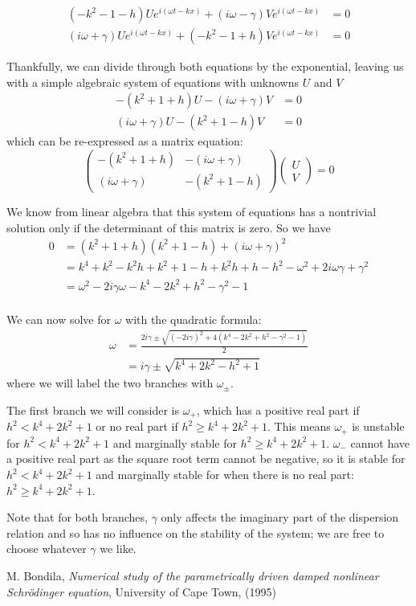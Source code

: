 \documentclass[11pt]{article}
\numberwithin{equation}{section}
\numberwithin{figure}{section}
\numberwithin{table}{section}
\begin{document}
\begin{align*}
    (-k^2-1-h)Ue^{i(\omega t-kx)}+(i\omega-\gamma)Ve^{i(\omega t-kx)}&=0\\
    (i\omega+\gamma)Ue^{i(\omega t-kx)}+(-k^2-1+h)Ve^{i(\omega t-kx)}&=0
\end{align*}
\par Thankfully, we can divide through both equations by the exponential, leaving us with a simple algebraic system of equations with unknowns $U$ and $V$
\begin{align*}
    -(k^2+1+h)U-(i\omega+\gamma)V&=0\\
    (i\omega+\gamma)U-(k^2+1-h)V&=0
\end{align*}
which can be re-expressed as a matrix equation:
\begin{equation}
    \begin{pmatrix}
        -(k^2+1+h) & -(i\omega+\gamma)\\
        (i\omega+\gamma) & -(k^2+1-h)
    \end{pmatrix}
    \begin{pmatrix}
        U\\
        V
    \end{pmatrix}
    =0
\end{equation}
\par We know from linear algebra that this system of equations has a nontrivial solution only if the determinant of this matrix is zero. So we have 
\begin{align*}
    0&=(k^2+1+h)(k^2+1-h)+(i\omega+\gamma)^2\\
    &=k^4+k^2-k^2h+k^2+1-h+k^2h+h-h^2-\omega^2+2i\omega\gamma+\gamma^2\\
    &=\omega^2-2i\gamma\omega-k^4-2k^2+h^2-\gamma^2-1\\
\end{align*}
\par We can now solve for $\omega$ with the quadratic formula:
\begin{align*}
    \omega&=\frac{2i\gamma\pm\sqrt{(-2i\gamma)^2+4(k^4-2k^2+h^2-\gamma^2-1)}}{2}\\
    &=i\gamma\pm\sqrt{k^4+2k^2-h^2+1}
\end{align*}
where we will label the two branches with $\omega_\pm$.
\par The first branch we will consider is $\omega_+$, which has a positive real part if $h^2<k^4+2k^2+1$ or no real part if $h^2\geq k^4+2k^2+1$. This means $\omega_+$ is unstable for $h^2<k^4+2k^2+1$ and marginally stable for $h^2\geq k^4+2k^2+1$. $\omega_-$ cannot have a positive real part as the square root term cannot be negative, so it is stable for $h^2<k^4+2k^2+1$ and marginally stable for when there is no real part: $h^2\geq k^4+2k^2+1$. 
\par Note that for both branches, $\gamma$ only affects the imaginary part of the dispersion relation and so has no influence on the stability of the system; we are free to choose whatever $\gamma$ we like.


\begin{thebibliography}{9}
    M. Bondila, \textit{Numerical study of the parametrically driven damped nonlinear Schr\"odinger equation}, University of Cape Town, (1995)
    
\end{thebibliography}
\end{document}
